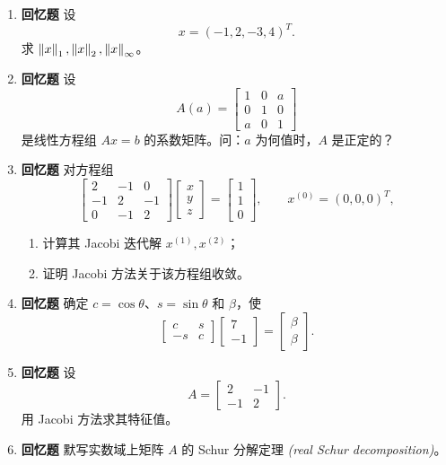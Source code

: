 \documentclass{article}
\newcommand{\oldtag}{\textcolor{red!65!black}{\textbf{回忆题}}}
\newcommand{\eng}[1]{\texorpdfstring{{\normalfont\rmfamily\itshape\textcolor{blue!65!black}{(#1)}}}{(#1)}}
\begin{document}
\begin{enumerate}
  \item \oldtag{} 设
  \[
    x=(-1,2,-3,4)^T.
  \]
  求 $\left\| x \right\|_1,\left\| x \right\|_2,\left\| x \right\|_\infty$。

  \item \oldtag{} 设
  \[
    A(a)=\begin{bmatrix}1&0&a\\0&1&0\\a&0&1\end{bmatrix}
  \]
  是线性方程组 $Ax=b$ 的系数矩阵。问：$a$ 为何值时，$A$ 是正定的？

  \item \oldtag{} 对方程组
  \[
    \begin{bmatrix}2&-1&0\\-1&2&-1\\0&-1&2\end{bmatrix}
    \begin{bmatrix}x\\y\\z\end{bmatrix}
    =
    \begin{bmatrix}1\\1\\0\end{bmatrix},\qquad x^{(0)}=(0,0,0)^T,
  \]
  \begin{enumerate}[(1)]
    \item 计算其 Jacobi 迭代解 $x^{(1)},x^{(2)}$；
    \item 证明 Jacobi 方法关于该方程组收敛。
  \end{enumerate}

  \item \oldtag{} 确定 $c=\cos\theta$、$s=\sin\theta$ 和 $\beta$，使
  \[
    \begin{bmatrix}c&s\\-s&c\end{bmatrix}
    \begin{bmatrix}7\\-1\end{bmatrix}
    =
    \begin{bmatrix}\beta\\\beta\end{bmatrix}.
  \]

  \item \oldtag{} 设
  \[
    A=\begin{bmatrix}2&-1\\-1&2\end{bmatrix}.
  \]
  用 Jacobi 方法求其特征值。

  \item \oldtag{} 默写实数域上矩阵 $A$ 的 Schur 分解定理 \eng{real Schur decomposition}。
\end{enumerate}
\end{document}
